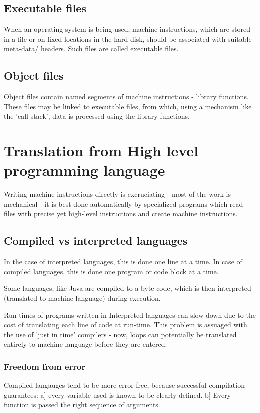 \documentclass[oneside, article]{memoir}
\begin{document}
\subsection{Executable files}
When an operating system is being used, machine instructions, which are stored in a file or on fixed locations in the hard-disk, should be associated with suitable meta-data/ headers. Such files are called executable files.

\subsection{Object files}
Object files contain named segments of machine instructions - library functions. These files may be linked to executable files, from which, using a mechanism like the 'call stack', data is processed using the library functions.

\section{Translation from High level programming language}
Writing machine instructions directly is excruciating - most of the work is mechanical - it is best done automatically by specialized programs which read files with precise yet high-level instructions and create machine instructions.

\subsection{Compiled vs interpreted languages}
In the case of interpreted languages, this is done one line at a time. In case of compiled languages, this is done one program or code block at a time.

Some languages, like Java are compiled to a byte-code, which is then interpreted (translated to machine language) during execution.

Run-times of programs written in Interpreted languages can slow down due to the cost of translating each line of code at run-time. This problem is assuaged with the use of 'just in time' compilers - now, loops can potentially be translated entirely to machine language before they are entered.

\subsubsection{Freedom from error}
Compiled langauges tend to be more error free, because successful compilation guarantees: a] every variable used is known  to be clearly defined. b] Every function is passed the right sequence of arguments.
\end{document}
